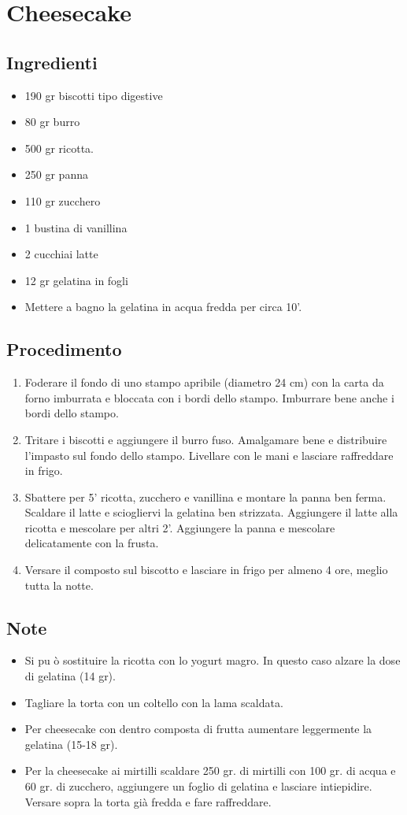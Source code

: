 \section{Cheesecake}
\subsection{Ingredienti}
\begin{itemize}
\item 190 gr biscotti tipo digestive  
\item 80 gr burro  
\item 500 gr ricotta.  
\item 250 gr panna  
\item 110 gr zucchero  
\item 1 bustina di vanillina  
\item 2 cucchiai latte  
\item 12 gr gelatina in fogli  
\item Mettere a bagno la gelatina in acqua fredda per circa 10'.
\end{itemize}
\subsection{Procedimento}
\begin{enumerate}
\item  Foderare il fondo di uno stampo apribile (diametro 24 cm) con la carta da forno imburrata e bloccata con i bordi dello stampo. Imburrare bene anche i bordi dello stampo.  
\item  Tritare i biscotti e aggiungere il burro fuso. Amalgamare bene e distribuire l'impasto sul fondo dello stampo. Livellare con le mani e lasciare raffreddare in frigo.  
\item  Sbattere per 5' ricotta, zucchero e vanillina e montare la panna ben ferma. Scaldare il latte e sciogliervi la gelatina ben strizzata. Aggiungere il latte alla ricotta e mescolare per altri 2'. Aggiungere la panna e mescolare delicatamente con la frusta.   
\item  Versare il composto sul biscotto e lasciare in frigo per almeno 4 ore, meglio tutta la notte.
\end{enumerate}
\subsection{Note}
\begin{itemize}
\item Si pu ò sostituire la ricotta con lo yogurt magro. In questo caso alzare la dose di gelatina (14 gr).  
\item Tagliare la torta con un coltello con la lama scaldata.  
\item Per cheesecake con dentro composta di frutta aumentare leggermente la gelatina (15-18 gr).  
\item Per la cheesecake ai mirtilli scaldare 250 gr. di mirtilli con 100 gr. di acqua e 60 gr. di zucchero, aggiungere un foglio di gelatina e lasciare intiepidire. Versare sopra la torta già fredda e fare raffreddare. 
\end{itemize}
